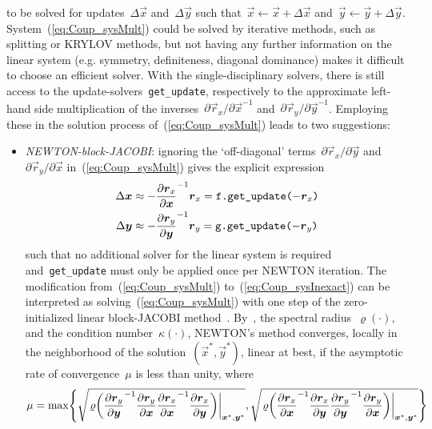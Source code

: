 \documentclass[10pt, ngerman, english,
twoside, open=right,
numbers=noenddot,
declaration=section,
abstract=section,
abstract=multiple,
abstract=notoc,
declaration=notoc,
cd=pale, 
chapterprefix=off, 
chapterpage=false, 
headingsvskip=-10em,
cdgeometry=custom, 
slantedgreek=on,
cdmath=on, 
cdfont=on,
ttfont=false,
mathswap=off,
]{tudscrreprt}
\numberwithin{equation}{chapter}
\renewcommand{\textsc}[1]{\uppercase{\mbox{#1}}}
\begin{document}
to be solved for updates~$\Delta\vec{x}$ and~$\Delta\vec{y}$ such that~$\vec{x} \gets \vec{x} + \Delta\vec{x}$ and~$\vec{y} \gets \vec{y} + \Delta\vec{y}$. System~(\ref{eq:Coup_sysMult}) could be solved by iterative methods, such as splitting or \textsc{Krylov} methods, but not having any further information on the linear system (e.g. symmetry, definiteness, diagonal dominance) makes it difficult to choose an efficient solver. With the single-disciplinary solvers, there is still access to the update-solvers~\texttt{get\_update}, respectively to the approximate left-hand side multiplication of the inverses~$\partial\vec{r}_x/\partial\vec{x}^{-1}$ and~$\partial\vec{r}_y/\partial\vec{y}^{-1}$. Employing these in the solution process of~(\ref{eq:Coup_sysMult}) leads to two suggestions:
\begin{itemize}
\item \textit{\textsc{Newton}-block-\textsc{Jacobi}}: ignoring the `off-diagonal' terms~$\partial\vec{r}_x/\partial\vec{y}$ and~$\partial\vec{r}_y/\partial\vec{x}$ in~(\ref{eq:Coup_sysMult}) gives the explicit expression
\begin{subequations}\begin{align}
\Delta\vec{x} &\approx -\pdiff{\vec{r}_x}{\vec{x}}^{-1} \vec{r}_x = \texttt{f.get\_update($-\vec{r}_x$)}\\*
\Delta\vec{y} &\approx -\pdiff{\vec{r}_y}{\vec{y}}^{-1} \vec{r}_y = \texttt{g.get\_update($-\vec{r}_y$)}
\end{align}\label{eq:Coup_sysInexact}\end{subequations}
such that no additional solver for the linear system is required and~\texttt{get\_update} must only be applied once per \textsc{Newton} iteration. The modification from~(\ref{eq:Coup_sysMult}) to~(\ref{eq:Coup_sysInexact}) can be interpreted as solving~(\ref{eq:Coup_sysMult}) with one step of the zero-initialized linear block-\textsc{Jacobi} method~\cite[see][Eq.~7.4.24]{Ortega}. By~\cite[see][Th.~10.3.1]{Ortega}, the spectral radius~$\varrho(\cdot)$, and the condition number~$\kappa(\cdot)$, \textsc{Newton}'s method converges, locally in the neighborhood of the solution~$(\vec{x}^*, \vec{y}^*)$, linear at best, if the asymptotic rate of convergence~$\mu$ is less than unity, where
\begin{align}
\mu &= \max\left\lbrace \sqrt{\at{\varrho\left( \pdiff{\vec{r}_y}{\vec{y}}^{-1} \pdiff{\vec{r}_y}{\vec{x}} \pdiff{\vec{r}_x}{\vec{x}}^{-1} \pdiff{\vec{r}_x}{\vec{y}} \right)}{\vec{x}^*, \vec{y}^*}}, \sqrt{\at{\varrho\left( \pdiff{\vec{r}_x}{\vec{x}}^{-1} \pdiff{\vec{r}_x}{\vec{y}} \pdiff{\vec{r}_y}{\vec{y}}^{-1} \pdiff{\vec{r}_y}{\vec{x}} \right)}{\vec{x}^*, \vec{y}^*}} \right\rbrace \nonumber\\*

\end{align}
\end{itemize}
\end{document}
